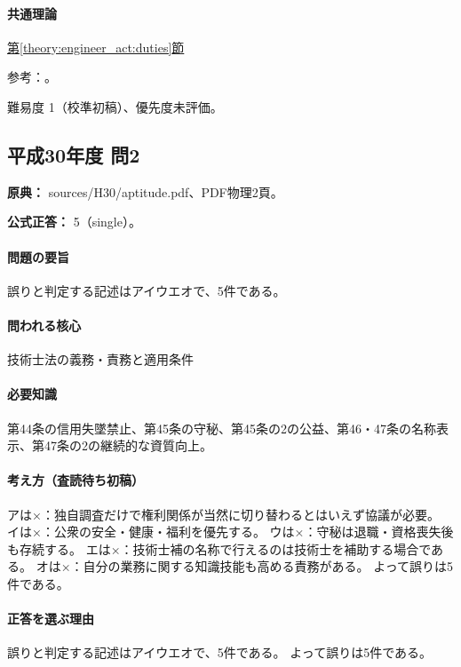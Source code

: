 \paragraph{共通理論} \hyperref[theory:engineer_act:duties]{第\ref*{theory:engineer_act:duties}節}

\par 参考：\cite{engineer_act_current}。

\par 難易度 1（校準初稿）、優先度未評価。

\subsection{平成30年度 問2}
\label{q:h30-reg-apt-02}

\noindent\textbf{原典：} sources/H30/aptitude.pdf、PDF物理2頁。

\textbf{公式正答：} 5（single）。

\paragraph{問題の要旨} 誤りと判定する記述はアイウエオで、5件である。

\paragraph{問われる核心} 技術士法の義務・責務と適用条件

\paragraph{必要知識} 第44条の信用失墜禁止、第45条の守秘、第45条の2の公益、第46・47条の名称表示、第47条の2の継続的な資質向上。

\paragraph{考え方（査読待ち初稿）} アは×：独自調査だけで権利関係が当然に切り替わるとはいえず協議が必要。 イは×：公衆の安全・健康・福利を優先する。 ウは×：守秘は退職・資格喪失後も存続する。 エは×：技術士補の名称で行えるのは技術士を補助する場合である。 オは×：自分の業務に関する知識技能も高める責務がある。 よって誤りは5件である。

\paragraph{正答を選ぶ理由} 誤りと判定する記述はアイウエオで、5件である。  よって誤りは5件である。

